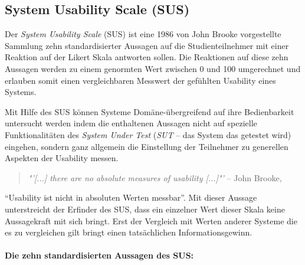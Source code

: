 \documentclass[11pt,a4paper,twoside,ngerman]{article}
\begin{document}
\subsection{System Usability Scale (SUS)} \label{sec:sus}
Der \emph{System Usability Scale} (SUS) ist eine 1986 von John Brooke vorgestellte Sammlung zehn standardisierter Aussagen \cite{brooke_sus} auf die Studienteilnehmer mit einer Reaktion auf der Likert Skala antworten sollen. Die Reaktionen auf diese zehn Aussagen werden zu einem genormten Wert zwischen 0 und 100 umgerechnet und erlauben somit einen vergleichbaren Messwert der gefühlten Usability eines Systems.

Mit Hilfe des SUS können Systeme Domäne-übergreifend auf ihre Bedienbarkeit untersucht werden indem die enthaltenen Aussagen nicht auf spezielle Funktionalitäten des \emph{System Under Test} (\emph{SUT} -- das System das getestet wird) eingehen, sondern ganz allgemein die Einstellung der Teilnehmer zu generellen Aspekten der Usability messen.

\begin{quote}
\emph{"'[...] there are no absolute measures of usability [...]"'} -- John Brooke, \cite{brooke_sus}
\end{quote}
"`Usability ist nicht in absoluten Werten messbar"'. Mit dieser Aussage unterstreicht der Erfinder des SUS, dass ein einzelner Wert dieser Skala keine Aussagekraft mit sich bringt. Erst der Vergleich mit Werten anderer Systeme die es zu vergleichen gilt bringt einen tatsächlichen Informationsgewinn.

\paragraph{Die zehn standardisierten Aussagen des SUS:}
\end{document}
